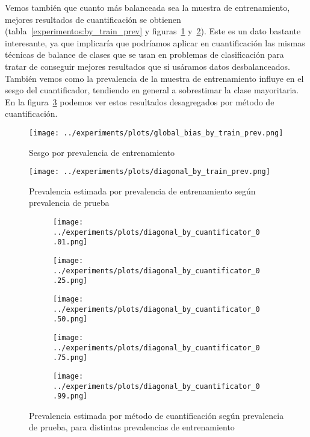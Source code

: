 Vemos también que cuanto más balanceada sea la muestra de entrenamiento, mejores
resultados de cuantificación se obtienen (tabla~\ref{experimentos:by_train_prev}
y figuras~\ref{fig:global_bias_by_train_prev}
y~\ref{fig:diagonal_by_train_prev}). Este es un dato bastante interesante, ya
que implicaría que podríamos aplicar en cuantificación las mismas técnicas de
balance de clases que se usan en problemas de clasificación para tratar de
conseguir mejores resultados que si usáramos datos desbalanceados. También vemos
como la prevalencia de la muestra de entrenamiento influye en el sesgo del
cuantificador, tendiendo en general a sobrestimar la clase mayoritaria. En la
figura~\ref{fig:diagonal_by_quantifier_by_train_prev} podemos ver estos
resultados desagregados por método de cuantificación.

\begin{figure}[H]
    \centering
    \centerline{\texttt{[image: ../experiments/plots/global\_bias\_by\_train\_prev.png]}}
    \caption{Sesgo por prevalencia de
    entrenamiento}\label{fig:global_bias_by_train_prev}
\end{figure}
\begin{figure}[H]
    \centering
    \centerline{\texttt{[image: ../experiments/plots/diagonal\_by\_train\_prev.png]}}
    \caption{Prevalencia estimada por prevalencia de entrenamiento según
    prevalencia de prueba}\label{fig:diagonal_by_train_prev}
\end{figure}

\begin{figure}[H]
    \centering
    \begin{subfigure}[b]{.4\textwidth}
        \centering
        \texttt{[image: ../experiments/plots/diagonal\_by\_cuantificator\_0.01.png]}\quad
    \end{subfigure}
    \begin{subfigure}[b]{.4\textwidth}
        \centering
        \texttt{[image: ../experiments/plots/diagonal\_by\_cuantificator\_0.25.png]}\quad
    \end{subfigure}
    \medskip
    \begin{subfigure}[b]{.4\textwidth}
        \centering
        \texttt{[image: ../experiments/plots/diagonal\_by\_cuantificator\_0.50.png]}
    \end{subfigure}
    \begin{subfigure}[b]{.4\textwidth}
        \centering
        \texttt{[image: ../experiments/plots/diagonal\_by\_cuantificator\_0.75.png]}\quad
    \end{subfigure}
    \begin{subfigure}[b]{.5\textwidth}
        \centering
        \texttt{[image: ../experiments/plots/diagonal\_by\_cuantificator\_0.99.png]}
    \end{subfigure}
    \medskip
    \hfill
    \caption{Prevalencia estimada por método de cuantificación según prevalencia
    de prueba, para distintas prevalencias de
    entrenamiento}\label{fig:diagonal_by_quantifier_by_train_prev}
\end{figure}

